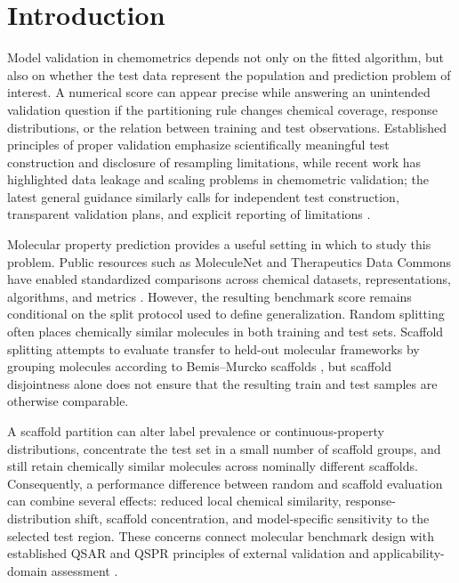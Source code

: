 \section{Introduction}

Model validation in chemometrics depends not only on the fitted algorithm, but also on whether the test data represent the population and prediction problem of interest. A numerical score can appear precise while answering an unintended validation question if the partitioning rule changes chemical coverage, response distributions, or the relation between training and test observations. Established principles of proper validation emphasize scientifically meaningful test construction and disclosure of resampling limitations, while recent work has highlighted data leakage and scaling problems in chemometric validation; the latest general guidance similarly calls for independent test construction, transparent validation plans, and explicit reporting of limitations \citep{esbensen2010proper,kiraly2025leakage,camacho2026validation}.

Molecular property prediction provides a useful setting in which to study this problem. Public resources such as MoleculeNet and Therapeutics Data Commons have enabled standardized comparisons across chemical datasets, representations, algorithms, and metrics \citep{wu2018moleculenet,huang2021tdc}. However, the resulting benchmark score remains conditional on the split protocol used to define generalization. Random splitting often places chemically similar molecules in both training and test sets. Scaffold splitting attempts to evaluate transfer to held-out molecular frameworks by grouping molecules according to Bemis--Murcko scaffolds \citep{bemis1996properties}, but scaffold disjointness alone does not ensure that the resulting train and test samples are otherwise comparable.

A scaffold partition can alter label prevalence or continuous-property distributions, concentrate the test set in a small number of scaffold groups, and still retain chemically similar molecules across nominally different scaffolds. Consequently, a performance difference between random and scaffold evaluation can combine several effects: reduced local chemical similarity, response-distribution shift, scaffold concentration, and model-specific sensitivity to the selected test region. These concerns connect molecular benchmark design with established QSAR and QSPR principles of external validation and applicability-domain assessment \citep{tropsha2003earnest,gramatica2007principles,netzeva2005applicability,sahigara2012applicability}.

